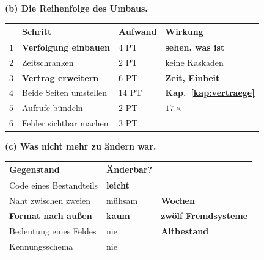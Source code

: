 \begin{aufgabe}
\medskip
\textbf{(b) Die Reihenfolge des Umbaus.}

\begin{center}
{\small
\renewcommand{\arraystretch}{1.45}
\begin{tabular}{@{}P{1.0cm}P{3.2cm}P{2.0cm}P{2.2cm}@{}}
\toprule
& \textbf{Schritt} & \textbf{Aufwand} & \textbf{Wirkung}\\
\midrule
$1$ & \textbf{Verfolgung einbauen} & $4$ PT & \textcolor{gruen}{\textbf{sehen, was ist}}\\
$2$ & Zeitschranken & $2$ PT & \textcolor{gruen}{keine Kaskaden}\\
$3$ & \textbf{Vertrag erweitern} & $6$ PT & \textcolor{gruen}{\textbf{Zeit, Einheit}}\\
$4$ & Beide Seiten umstellen & \textcolor{akzent}{$14$ PT} & \textbf{Kap.~\ref{kap:vertraege}}\\
$5$ & Aufrufe bündeln & $2$ PT & \textcolor{gruen}{$17\times$}\\
$6$ & Fehler sichtbar machen & $3$ PT & \\
\bottomrule
\end{tabular}}
\end{center}

\begin{center}
\begin{minipage}{0.88\textwidth}
\end{minipage}
\end{center}

\begin{center}
\end{center}

\medskip
\textbf{(c) Was nicht mehr zu ändern war.}

\begin{center}
{\small
\renewcommand{\arraystretch}{1.5}
\begin{tabular}{@{}P{3.0cm}P{2.2cm}P{2.6cm}@{}}
\toprule
\textbf{Gegenstand} & \textbf{Änderbar?} & \\
\midrule
Code eines Bestandteils & \textcolor{gruen}{\textbf{leicht}} & \\
Naht zwischen zweien & \textcolor{mittel}{mühsam} & \textbf{Wochen}\\
\textbf{Format nach außen} & \textcolor{akzent}{\textbf{kaum}} & \textcolor{akzent}{\textbf{zwölf Fremdsysteme}}\\
Bedeutung eines Feldes & \textcolor{akzent}{nie} & \textcolor{akzent}{\textbf{Altbestand}}\\
Kennungs\-schema & \textcolor{akzent}{nie} & \\
\bottomrule
\end{tabular}}
\end{center}


\end{aufgabe}
